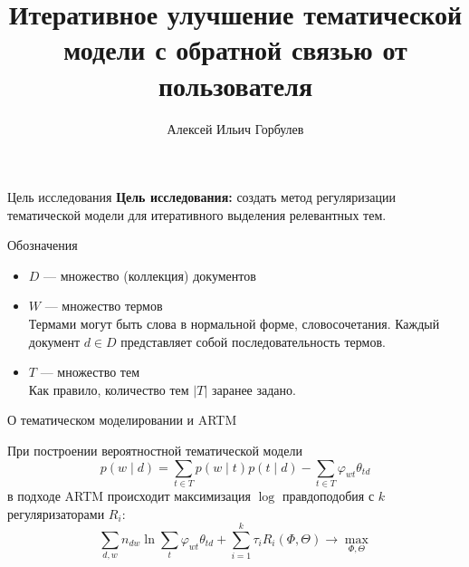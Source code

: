 \documentclass{beamer}
\title[\hbox to 56mm{Итеративное улучшение}]{Итеративное улучшение тематической \\ модели с обратной связью от пользователя}
\author[А.\,И. Горбулев]{Алексей Ильич Горбулев}
\institute{Московский физико-технический институт}
\date{\footnotesize
\par\smallskip\emph{Курс:} Моя первая научная статья/Группа Б05-021а
\par\smallskip\emph{Эксперт:} д. ф.-м. н. К.\,В.~Воронцов
\par\smallskip\emph{Консультант:} В.\,А.~Алексеев
\par\bigskip\small 2023}
\begin{document}
\begin{frame}
\thispagestyle{empty}
\maketitle
\end{frame}

\begin{frame}{Цель исследования}
    \textbf{Цель исследования:} создать метод  регуляризации тематической модели для итеративного выделения релевантных тем.
\end{frame}

\begin{frame}{Обозначения}
    \begin{itemize}
        \item $D$ — множество (коллекция) документов
        \item $W$ — множество термов \\ {\footnotesize Термами могут быть слова в нормальной форме, словосочетания. Каждый документ $d \in D$ представляет собой последовательность термов.}
        \item $T$ — множество тем \\ {\footnotesize Как правило, количество тем $|T|$ заранее задано.}
        \end{itemize}
\end{frame}
\begin{frame}{О тематическом моделировании и ARTM}

При построении вероятностной тематической модели
$$p (w \mid d) = \sum \limits_{t \in T} p (w \mid t) p (t \mid d) - \sum \limits_{t \in T} \varphi_{wt} \theta_{td}$$
в подходе ARTM происходит максимизация $\log$ правдоподобия с $k$ регуляризаторами $R_i$:
$$\sum \limits_{d, w} n_{dw} \ln \sum \limits_{t} \varphi_{wt} \theta_{td} + \sum \limits_{i = 1}^k \tau_i R_i (\Phi, \Theta) \to \max \limits_{\Phi, \Theta}$$

\end{frame}
\end{document}
